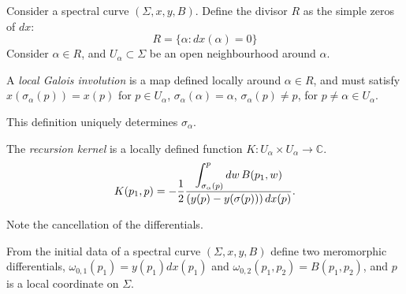     Consider a spectral curve \( (\Sigma,x,y,B)\).
    Define the divisor \(R\) as the simple zeros of \(dx\): 
    \[ R = \{ \alpha : d x(\alpha) = 0 \} \]
    Consider \( \alpha \in  R\), and \( U_{\alpha} \subset \Sigma\) be an open neighbourhood around \(\alpha\).
    \begin{defn}
    A \emph{local Galois involution} is a map defined locally around \(\alpha \in R\), and must satisfy \( x( \sigma_{\alpha}(p)) = x(p)\) for \( p \in U_{\alpha}\), \( \sigma_{\alpha}(\alpha) = \alpha \), \( \sigma_{\alpha}(p) \neq p\), for \(p \neq \alpha \in U_{\alpha}\).
    \end{defn}
    This definition uniquely determines \( \sigma_{\alpha}\).
    
    \begin{defn}
    The \emph{recursion kernel} is a locally defined function \( K : U_{\alpha} \times U_{\alpha} \rightarrow \mathbb{C}\).
    \[ K(p_1, p)  = -\frac{1}{2} \frac{\displaystyle \int_{\sigma_{\alpha}(p)}^{p} dw \, B(p_1,w)}{\displaystyle (y(p) - y(\sigma(p))) \, dx(p)}. \]
    \end{defn}
    Note the cancellation of the differentials.
    
    
    From the initial data of a spectral curve \((\Sigma, x,y,B)\) define two meromorphic differentials, \( \omega_{0,1}(p_1) = y(p_1) dx(p_1)\) and \( \omega_{0,2}(p_1, p_2) = B(p_1,p_2)\), and \(p\) is a local coordinate on \( \Sigma\).
    
